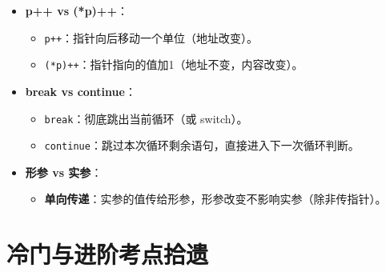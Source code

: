 \documentclass[a4paper,12pt]{article}
\begin{document}
\begin{itemize}
    \item \textbf{p++ vs (*p)++}：
    \begin{itemize}
        \item \texttt{p++}：指针向后移动一个单位（地址改变）。
        \item \texttt{(*p)++}：指针指向的值加1（地址不变，内容改变）。
    \end{itemize}

    \item \textbf{break vs continue}：
    \begin{itemize}
        \item \texttt{break}：彻底跳出当前循环（或 switch）。
        \item \texttt{continue}：跳过本次循环剩余语句，直接进入下一次循环判断。
    \end{itemize}
    
    \item \textbf{形参 vs 实参}：
    \begin{itemize}
        \item \textbf{单向传递}：实参的值传给形参，形参改变不影响实参（除非传指针）。
    \end{itemize}
\end{itemize}

\section{冷门与进阶考点拾遗}
\end{document}

